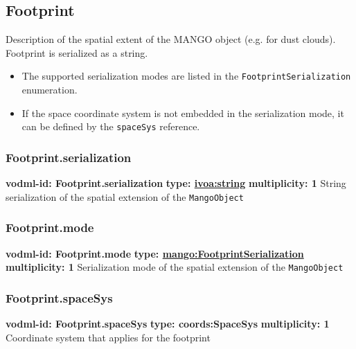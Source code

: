   \subsection{Footprint}
  \label{sect:Footprint}
    Description of the spatial extent of the MANGO object (e.g. for dust clouds). Footprint is serialized as a string. \begin{itemize} \item The supported serialization modes are listed in the \texttt{FootprintSerialization} enumeration. \item If the space coordinate system is not embedded in the serialization mode, it can be defined by the \texttt{spaceSys} reference. \end{itemize}

    \subsubsection{Footprint.serialization}
      \textbf{vodml-id: Footprint.serialization} \newline
      \textbf{type: \hyperref[sect:ivoa]{ivoa:string}} \newline
      \textbf{multiplicity: 1} \newline
      String serialization of the spatial extension of the \texttt{MangoObject}

    \subsubsection{Footprint.mode}
      \textbf{vodml-id: Footprint.mode} \newline
      \textbf{type: \hyperref[sect:FootprintSerialization]{mango:FootprintSerialization}} \newline
      \textbf{multiplicity: 1} \newline
      Serialization mode of the spatial extension of the \texttt{MangoObject} \newline

    \subsubsection{Footprint.spaceSys}
      \textbf{vodml-id: Footprint.spaceSys} \newline
      \textbf{type: coords:SpaceSys} \newline
      \textbf{multiplicity: 1} \newline
      Coordinate system that applies for the footprint

